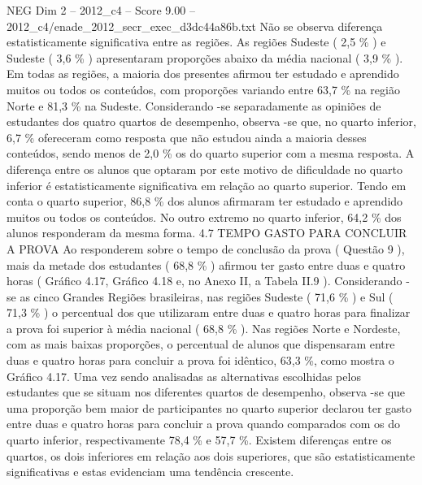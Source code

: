 \begin{textsample}{NEG Dim 2 – 2012\_c4 – Score 9.00 – 2012\_c4/enade\_2012\_secr\_exec\_d3dc44a86b.txt}
Não se observa diferença estatisticamente significativa entre as regiões.
As regiões Sudeste ( 2,5 \% ) e Sudeste ( 3,6 \% ) apresentaram proporções abaixo da média nacional ( 3,9 \% ).
Em todas as regiões, a maioria dos presentes afirmou ter estudado e aprendido muitos ou todos os conteúdos, com proporções variando entre 63,7 \% na região Norte e 81,3 \% na Sudeste.
Considerando -se separadamente as opiniões de estudantes dos quatro quartos de desempenho, observa -se que, no quarto inferior, 6,7 \% ofereceram como resposta que não estudou ainda a maioria desses conteúdos, sendo menos de 2,0 \% os do quarto superior com a mesma resposta.
A diferença entre os alunos que optaram por este motivo de dificuldade no quarto inferior é estatisticamente significativa em relação ao quarto superior.
Tendo em conta o quarto superior, 86,8 \% dos alunos afirmaram ter estudado e aprendido muitos ou todos os conteúdos.
No outro extremo no quarto inferior, 64,2 \% dos alunos responderam da mesma forma. 4.7 TEMPO GASTO PARA CONCLUIR A PROVA Ao responderem sobre o tempo de conclusão da prova ( Questão 9 ), mais da metade dos estudantes ( 68,8 \% ) afirmou ter gasto entre duas e quatro horas ( Gráfico 4.17, Gráfico 4.18 e, no Anexo II, a Tabela II.9 ).
Considerando -se as cinco Grandes Regiões brasileiras, nas regiões Sudeste ( 71,6 \% ) e Sul ( 71,3 \% ) o percentual dos que utilizaram entre duas e quatro horas para finalizar a prova foi superior à média nacional ( 68,8 \% ).
Nas regiões Norte e Nordeste, com as mais baixas proporções, o percentual de alunos que dispensaram entre duas e quatro horas para concluir a prova foi idêntico, 63,3 \%, como mostra o Gráfico 4.17.
Uma vez sendo analisadas as alternativas escolhidas pelos estudantes que se situam nos diferentes quartos de desempenho, observa -se que uma proporção bem maior de participantes no quarto superior declarou ter gasto entre duas e quatro horas para concluir a prova quando comparados com os do quarto inferior, respectivamente 78,4 \% e 57,7 \%.
Existem diferenças entre os quartos, os dois inferiores em relação aos dois superiores, que são estatisticamente significativas e estas evidenciam uma tendência crescente.

\end{textsample}
